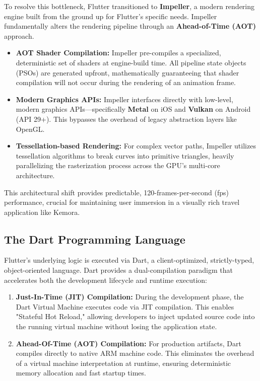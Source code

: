 To resolve this bottleneck, Flutter transitioned to \textbf{Impeller}, a modern rendering engine built from the ground up for Flutter's specific needs. Impeller fundamentally alters the rendering pipeline through an \textbf{Ahead-of-Time (AOT)} approach.
\begin{itemize}
    \item \textbf{AOT Shader Compilation:} Impeller pre-compiles a specialized, deterministic set of shaders at engine-build time. All pipeline state objects (PSOs) are generated upfront, mathematically guaranteeing that shader compilation will not occur during the rendering of an animation frame.
    \item \textbf{Modern Graphics APIs:} Impeller interfaces directly with low-level, modern graphics APIs—specifically \textbf{Metal} on iOS and \textbf{Vulkan} on Android (API 29+). This bypasses the overhead of legacy abstraction layers like OpenGL.
    \item \textbf{Tessellation-based Rendering:} For complex vector paths, Impeller utilizes tessellation algorithms to break curves into primitive triangles, heavily parallelizing the rasterization process across the GPU's multi-core architecture.
\end{itemize}
This architectural shift provides predictable, 120-frames-per-second (fps) performance, crucial for maintaining user immersion in a visually rich travel application like Kemora.

\subsection{The Dart Programming Language}
Flutter's underlying logic is executed via Dart, a client-optimized, strictly-typed, object-oriented language. Dart provides a dual-compilation paradigm that accelerates both the development lifecycle and runtime execution:
\begin{enumerate}
    \item \textbf{Just-In-Time (JIT) Compilation:} During the development phase, the Dart Virtual Machine executes code via JIT compilation. This enables "Stateful Hot Reload," allowing developers to inject updated source code into the running virtual machine without losing the application state.
    \item \textbf{Ahead-Of-Time (AOT) Compilation:} For production artifacts, Dart compiles directly to native ARM machine code. This eliminates the overhead of a virtual machine interpretation at runtime, ensuring deterministic memory allocation and fast startup times.
\end{enumerate}

